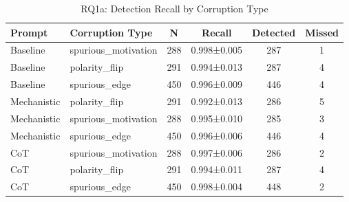 \begin{table}[htbp]
\centreing
\caption{RQ1a: Detection Recall by Corruption Type}
\label{tab:rq1a_corruption_type}
\begin{tabular}{llcccc}
\toprule
\textbf{Prompt} & \textbf{Corruption Type} & \textbf{N} & \textbf{Recall} & \textbf{Detected} & \textbf{Missed} \\
\midrule
Baseline & spurious_motivation & 288 & 0.998±0.005 & 287 & 1 \\
Baseline & polarity_flip & 291 & 0.994±0.013 & 287 & 4 \\
Baseline & spurious_edge & 450 & 0.996±0.009 & 446 & 4 \\
Mechanistic & polarity_flip & 291 & 0.992±0.013 & 286 & 5 \\
Mechanistic & spurious_motivation & 288 & 0.995±0.010 & 285 & 3 \\
Mechanistic & spurious_edge & 450 & 0.996±0.006 & 446 & 4 \\
CoT & spurious_motivation & 288 & 0.997±0.006 & 286 & 2 \\
CoT & polarity_flip & 291 & 0.994±0.011 & 287 & 4 \\
CoT & spurious_edge & 450 & 0.998±0.004 & 448 & 2 \\
\bottomrule
\end{tabular}
\end{table}